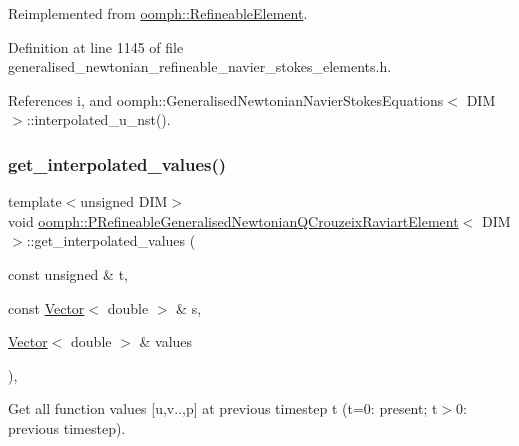 Reimplemented from \hyperlink{classoomph_1_1RefineableElement_ad9a4f92880668a2373326d8306365c43}{oomph\+::\+Refineable\+Element}.



Definition at line 1145 of file generalised\+\_\+newtonian\+\_\+refineable\+\_\+navier\+\_\+stokes\+\_\+elements.\+h.



References i, and oomph\+::\+Generalised\+Newtonian\+Navier\+Stokes\+Equations$<$ D\+I\+M $>$\+::interpolated\+\_\+u\+\_\+nst().

\mbox{\label{classoomph_1_1PRefineableGeneralisedNewtonianQCrouzeixRaviartElement_ada4c5910a99fc57caff3c190307c7a87}} 
\subsubsection{\texorpdfstring{get\+\_\+interpolated\+\_\+values()}{get\_interpolated\_values()}\hspace{0.1cm}{\footnotesize\ttfamily [2/2]}}
{\footnotesize\ttfamily template$<$unsigned D\+IM$>$ \\
void \hyperlink{classoomph_1_1PRefineableGeneralisedNewtonianQCrouzeixRaviartElement}{oomph\+::\+P\+Refineable\+Generalised\+Newtonian\+Q\+Crouzeix\+Raviart\+Element}$<$ D\+IM $>$\+::get\+\_\+interpolated\+\_\+values (\begin{DoxyParamCaption}\item[{const unsigned \&}]{t,  }\item[{const \hyperlink{classoomph_1_1Vector}{Vector}$<$ double $>$ \&}]{s,  }\item[{\hyperlink{classoomph_1_1Vector}{Vector}$<$ double $>$ \&}]{values }\end{DoxyParamCaption})\hspace{0.3cm}{\ttfamily [inline]}, {\ttfamily [virtual]}}



Get all function values \mbox{[}u,v..,p\mbox{]} at previous timestep t (t=0\+: present; t$>$0\+: previous timestep). 

